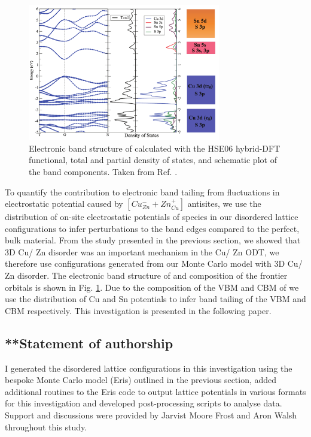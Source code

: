 \documentclass[11pt, twoside]{report}
\begin{document}
\begin{figure}[h!]
  \centering
    \includegraphics[width=0.75\textwidth]{figures/CZTS_band_structure.png}
    \caption[Electronic band structure of {\CZTS} calculated with the HSE06 hybrid-DFT functional, total and partial density of states, and schematic plot of the band components.]{Electronic band structure of {\CZTS} calculated with the HSE06 hybrid-DFT functional, total and partial density of states, and schematic plot of the band components. Taken from Ref. .}
  \label{CZTS_band_structure}
\end{figure}

To quantify the contribution to electronic band tailing from fluctuations in electrostatic potential caused by $[Cu_{Zn}^{-} + Zn_{Cu}^{+}]$ antisites, we use the distribution of on-site electrostatic potentials of species in our disordered lattice configurations to infer perturbations to the band edges compared to the perfect, bulk material. From the study presented in the previous section, we showed that 3D Cu/ Zn disorder was an important mechanism in the Cu/ Zn ODT, we therefore use configurations generated from our Monte Carlo model with 3D Cu/ Zn disorder. The electronic band structure of {\CZTS} and composition of the frontier orbitals is shown in Fig. \ref{CZTS_band_structure}. Due to the composition of the VBM and CBM of {\CZTS} we use the distribution of Cu and Sn potentials to infer band tailing of the VBM and CBM respectively. This investigation is presented in the following paper.

\subsection{**Statement of authorship}
I generated the disordered lattice configurations in this investigation using the bespoke Monte Carlo model (Eris) outlined in the previous section, added additional routines to the Eris code to output lattice potentials in various formats for this investigation and developed post-processing scripts to analyse data. Support and discussions were provided by Jarvist Moore Frost and Aron Walsh throughout this study.
\end{document}
